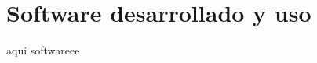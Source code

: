 \chapter[Capítulo 5. Software desarrollado y uso]{Software desarrollado y uso}

aqui softwareee

\newpage


